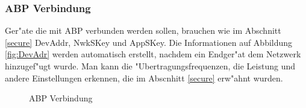\subsubsection{ABP Verbindung}
Ger"ate die mit ABP verbunden werden sollen, brauchen wie im Abschnitt
\ref{secure} DevAddr, NwkSKey und AppSKey.
Die Informationen auf Abbildung \ref{fig:DevAdr} werden automatisch
erstellt, nachdem ein Endger"at dem Netzwerk hinzugef"ugt wurde. Man
kann die "Ubertragungsfrequenzen, die Leistung und andere Einstellungen
erkennen, die im Abscnhitt \ref{secure} erw"ahnt wurden. 
	\begin{figure}[h!]
	\centering
	\caption{ABP Verbindung}
	\end{figure}

